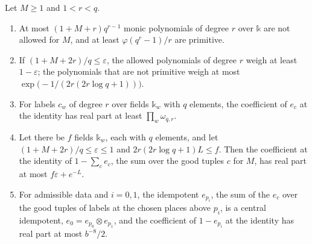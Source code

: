 \begin{proposition}\label{prop:bad-types}
Let $M\ge1$ and $1<r<q$.
\begin{enumerate}[label=\textup{(\alph*)}]
\item At most $(1+M+r)q^{r-1}$ monic polynomials of degree $r$ over $\mathbb k$ are not allowed for $M$, and at least $\varphi(q^r-1)/r$ are primitive.
\item If $(1+M+2r)/q\le\varepsilon$, the allowed polynomials of degree $r$ weigh at least $1-\varepsilon$; the polynomials that are not primitive weigh at most
$\exp\bigl(-1/(2r(2r\log q+1))\bigr)$.
\item For labels $c_w$ of degree $r$ over fields $\mathbb k_w$ with $q$ elements, the coefficient of $e_c$ at the identity has real part at least $\prod_w\omega_{q,r}$.
\item Let there be $f$ fields $\mathbb k_w$, each with $q$ elements, and let $(1+M+2r)/q\le\varepsilon\le1$ and $2r(2r\log q+1)L\le f$. Then the coefficient at the identity of
$1-\sum_ce_c$, the sum over the good tuples $c$ for $M$, has real part at most $f\varepsilon+e^{-L}$.
\item For admissible data and $i=0,1$, the idempotent $e_{p_i}$, the sum of the $e_c$ over the good tuples of labels at the chosen places above $p_i$, is a central idempotent,
$e_0=e_{p_0}\otimes e_{p_1}$, and the coefficient of $1-e_{p_i}$ at the identity has real part at most $b^{-8}/2$.
\end{enumerate}
\end{proposition}


